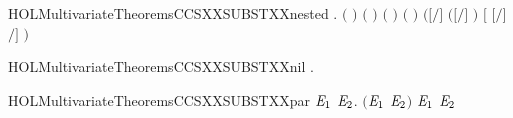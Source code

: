 \newcommand{\HOLMultivariateTheoremsCCSXXSUBSTXXISXXPROC}{\UseVerbatim{HOLMultivariateTheoremsCCSXXSUBSTXXISXXPROC}}
\begin{SaveVerbatim}{HOLMultivariateTheoremsCCSXXSUBSTXXnested}
\HOLTokenTurnstile{} \HOLSymConst{\HOLTokenForall{}}   .
         \HOLSymConst{\HOLTokenConj{}} \ensuremath{(}  \HOLSymConst{\ensuremath{=}}  \ensuremath{)} \HOLSymConst{\HOLTokenConj{}}
       \ensuremath{(}  \HOLSymConst{\ensuremath{=}}  \ensuremath{)} \HOLSymConst{\HOLTokenConj{}}  \ensuremath{(} \ensuremath{)} \ensuremath{(} \ensuremath{)} \HOLSymConst{\HOLTokenImp{}}
       \ensuremath{(}\ensuremath{[}\ensuremath{/}\ensuremath{]} \ensuremath{(}\ensuremath{[}\ensuremath{/}\ensuremath{]} \ensuremath{)} \HOLSymConst{\ensuremath{=}} \ensuremath{[} \ensuremath{[}\ensuremath{/}\ensuremath{]} \ensuremath{/}\ensuremath{]} \ensuremath{)}
\end{SaveVerbatim}
\newcommand{\HOLMultivariateTheoremsCCSXXSUBSTXXnested}{\UseVerbatim{HOLMultivariateTheoremsCCSXXSUBSTXXnested}}
\begin{SaveVerbatim}{HOLMultivariateTheoremsCCSXXSUBSTXXnil}
\HOLTokenTurnstile{} \HOLSymConst{\HOLTokenForall{}}.    \HOLSymConst{\ensuremath{=}} 
\end{SaveVerbatim}
\newcommand{\HOLMultivariateTheoremsCCSXXSUBSTXXnil}{\UseVerbatim{HOLMultivariateTheoremsCCSXXSUBSTXXnil}}
\begin{SaveVerbatim}{HOLMultivariateTheoremsCCSXXSUBSTXXpar}
\HOLTokenTurnstile{} \HOLSymConst{\HOLTokenForall{}} \ensuremath{\HOLBoundVar{E}\sb{\mathrm{1}}} \ensuremath{\HOLBoundVar{E}\sb{\mathrm{2}}}.
         \ensuremath{(}\ensuremath{\HOLBoundVar{E}\sb{\mathrm{1}}} \HOLSymConst{\ensuremath{\mid}} \ensuremath{\HOLBoundVar{E}\sb{\mathrm{2}}}\ensuremath{)} \HOLSymConst{\ensuremath{=}}
         \ensuremath{\HOLBoundVar{E}\sb{\mathrm{1}}} \HOLSymConst{\ensuremath{\mid}}   \ensuremath{\HOLBoundVar{E}\sb{\mathrm{2}}}
\end{SaveVerbatim}
